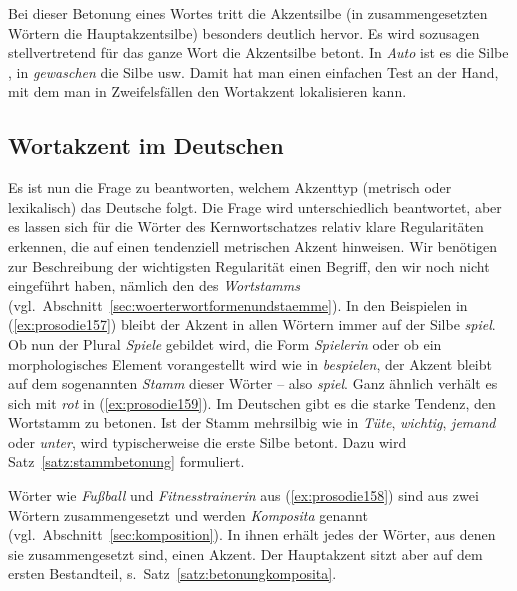 Bei dieser Betonung eines Wortes tritt die Akzentsilbe (in zusammengesetzten Wörtern die Hauptakzentsilbe) besonders deutlich hervor.
Es wird sozusagen stellvertretend für das ganze Wort die Akzentsilbe betont.
In \textit{Auto} ist es die Silbe \textipa{[\t{aO}]}, in \textit{gewaschen} die Silbe \textipa{[va]} usw.
Damit hat man einen einfachen Test an der Hand, mit dem man in Zweifelsfällen den Wortakzent lokalisieren kann.

\subsection{Wortakzent im Deutschen}
\label{sec:wortakzentimdeutschen}

Es ist nun die Frage zu beantworten, welchem Akzenttyp (metrisch oder lexikalisch) das Deutsche folgt.
Die Frage wird unterschiedlich beantwortet, aber es lassen sich für die Wörter des Kernwortschatzes relativ klare Regularitäten erkennen, die auf einen tendenziell metrischen Akzent hinweisen.
Wir benötigen zur Beschreibung der wichtigsten Regularität einen Begriff, den wir noch nicht eingeführt haben, nämlich den des \label{abs:wortakzentimdeutschen170}\textit{Wortstamms} (vgl.\ Abschnitt~\ref{sec:woerterwortformenundstaemme}).
In den Beispielen in (\ref{ex:prosodie157}) bleibt der Akzent in allen Wörtern immer auf der Silbe \textit{spiel}.
Ob nun der Plural \textit{Spiele} gebildet wird, die Form \textit{Spielerin} oder ob ein morphologisches Element vorangestellt wird wie in \textit{bespielen}, der Akzent bleibt auf dem sogenannten \textit{Stamm} dieser Wörter -- also \textit{spiel}.
Ganz ähnlich verhält es sich mit \textit{rot} in (\ref{ex:prosodie159}).
Im Deutschen gibt es die starke Tendenz, den Wortstamm zu betonen.
Ist der Stamm mehrsilbig wie in \textit{Tüte}, \textit{wichtig}, \textit{jemand} oder \textit{unter}, wird typischerweise die erste Silbe betont.
Dazu wird Satz~\ref{satz:stammbetonung} formuliert.


Wörter wie \textit{Fußball} und \textit{Fitnesstrainerin} aus (\ref{ex:prosodie158}) sind aus zwei Wörtern zusammengesetzt und werden \textit{Komposita} genannt (vgl.\ Abschnitt~\ref{sec:komposition}).
In ihnen erhält jedes der Wörter, aus denen sie zusammengesetzt sind, einen Akzent.
Der Hauptakzent sitzt aber auf dem ersten Bestandteil, s.\ Satz~\ref{satz:betonungkomposita}.

